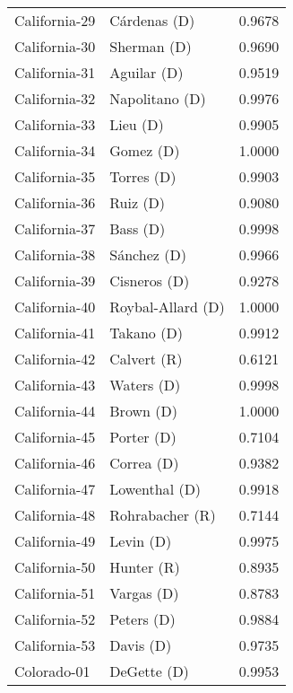 \begin{longtable}{llr}
     California-29 &         Cárdenas (D) &       0.9678 \\
     California-30 &          Sherman (D) &       0.9690 \\
     California-31 &          Aguilar (D) &       0.9519 \\
     California-32 &       Napolitano (D) &       0.9976 \\
     California-33 &             Lieu (D) &       0.9905 \\
     California-34 &            Gomez (D) &       1.0000 \\
     California-35 &           Torres (D) &       0.9903 \\
     California-36 &             Ruiz (D) &       0.9080 \\
     California-37 &             Bass (D) &       0.9998 \\
     California-38 &          Sánchez (D) &       0.9966 \\
     California-39 &         Cisneros (D) &       0.9278 \\
     California-40 &    Roybal-Allard (D) &       1.0000 \\
     California-41 &           Takano (D) &       0.9912 \\
     California-42 &          Calvert (R) &       0.6121 \\
     California-43 &           Waters (D) &       0.9998 \\
     California-44 &            Brown (D) &       1.0000 \\
     California-45 &           Porter (D) &       0.7104 \\
     California-46 &           Correa (D) &       0.9382 \\
     California-47 &        Lowenthal (D) &       0.9918 \\
     California-48 &      Rohrabacher (R) &       0.7144 \\
     California-49 &            Levin (D) &       0.9975 \\
     California-50 &           Hunter (R) &       0.8935 \\
     California-51 &           Vargas (D) &       0.8783 \\
     California-52 &           Peters (D) &       0.9884 \\
     California-53 &            Davis (D) &       0.9735 \\
       Colorado-01 &          DeGette (D) &       0.9953 \\

\end{longtable}
